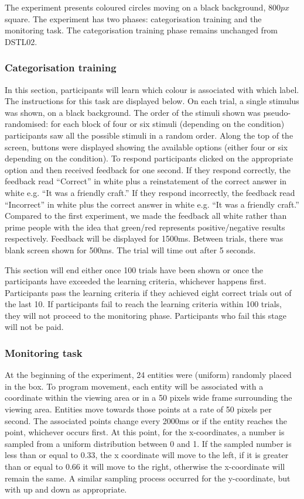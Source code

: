 \documentclass[doc, a4paper, apacite]{apa6}
\begin{document}
The experiment presents coloured circles moving on a black background, $800px$ square. 
The experiment has two phases: categorisation training and the monitoring task.
The categorisation training phase remains unchanged from DSTL02.  

\subsubsection{Categorisation training}
In this section, participants will learn which colour is associated with which label. 
The instructions for this task are displayed below. 
On each trial, a single stimulus was shown, on a black background. 
The order of the stimuli shown was pseudo-randomised: for each block of four or six stimuli (depending on the condition) participants saw all the possible stimuli in a random order. 
Along the top of the screen, buttons were displayed showing the available options (either four or six depending on the condition). 
To respond participants clicked on the appropriate option and then received feedback for one second. 
If they respond correctly, the feedback read ``Correct'' in white plus a reinstatement of the correct answer in white e.g. ``It was a friendly craft.'' 
If they respond incorrectly, the feedback read ``Incorrect'' in white plus the correct answer in white e.g. ``It was a friendly craft.''
Compared to the first experiment, we made the feedback all white rather than prime people with the idea that green/red represents positive/negative results respectively.
Feedback will be displayed for 1500ms.
Between trials, there was blank screen shown for 500ms. 
The trial will time out after 5 seconds. 

This section will end either once 100 trials have been shown or once the participants have exceeded the learning criteria, whichever happens first. 
Participants pass the learning criteria if they achieved eight correct trials out of the last 10. 
If participants fail to reach the learning criteria within 100 trials, they will not proceed to the monitoring phase.
Participants who fail this stage will not be paid. 

\subsubsection{Monitoring task}
At the beginning of the experiment, 24 entities were (uniform) randomly placed in the box. 
To program movement, each entity will be associated with a coordinate within the viewing area or in a 50 pixels wide frame surrounding the viewing area. 
Entities move towards those points at a rate of 50 pixels per second.
The associated points change every 2000ms or if the entity reaches the point, whichever occurs first. 
At this point, for the x-coordinates, a number is sampled from a uniform distribution between 0 and 1.
If the sampled number is less than or equal to 0.33, the x coordinate will move to the left, if it is greater than or equal to 0.66 it will move to the right, otherwise the x-coordinate will remain the same. 
A similar sampling process occurred for the y-coordinate, but with up and down as appropriate. 
\end{document}
